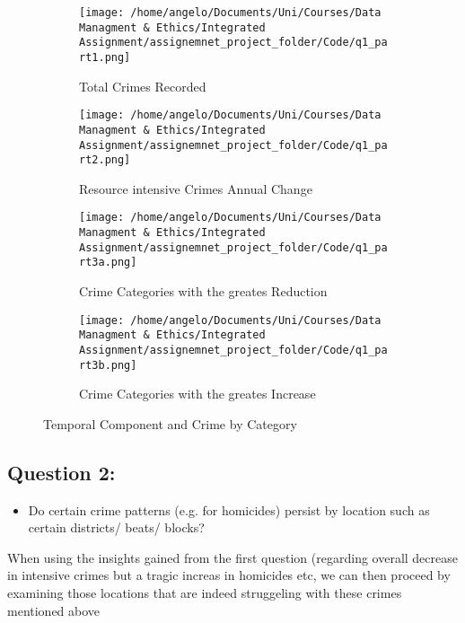 \documentclass[a4paper]{article}
\begin{document}
\begin{wrapfigure}{L}{9cm}
\centering
\begin{subfigure}[b]{0.5\textwidth}
\texttt{[image: /home/angelo/Documents/Uni/Courses/Data Managment \& Ethics/Integrated Assignment/assignemnet\_project\_folder/Code/q1\_part1.png]}
   \caption{Total Crimes Recorded}
   \label{fig:Ng2}
\end{subfigure}

\begin{subfigure}[b]{0.5\textwidth}
\texttt{[image: /home/angelo/Documents/Uni/Courses/Data Managment \& Ethics/Integrated Assignment/assignemnet\_project\_folder/Code/q1\_part2.png]}
   \caption{Resource intensive Crimes Annual Change}
   \label{fig:Ng2}
\end{subfigure}

\begin{subfigure}[b]{0.5\textwidth}
\texttt{[image: /home/angelo/Documents/Uni/Courses/Data Managment \& Ethics/Integrated Assignment/assignemnet\_project\_folder/Code/q1\_part3a.png]}
   \caption{Crime Categories with the greates Reduction}
   \label{fig:Ng2}
\end{subfigure}

\begin{subfigure}[b]{0.5\textwidth}
\texttt{[image: /home/angelo/Documents/Uni/Courses/Data Managment \& Ethics/Integrated Assignment/assignemnet\_project\_folder/Code/q1\_part3b.png]}
   \caption{Crime Categories with the greates Increase}
   \label{fig:Ng2}
\end{subfigure}

\captionsetup{justification=centering}
\caption{Temporal Component and Crime by Category}
\end{wrapfigure}



\subsection{Question 2:}


\begin{itemize}
  \item Do certain crime patterns (e.g. for homicides) persist by location such as certain districts/ beats/ blocks?
\end{itemize}


When using the insights gained from the first question (regarding overall decrease in intensive crimes but a tragic increas in homicides etc, we can then proceed by examining those locations that are indeed struggeling with these crimes mentioned above
\end{document}

